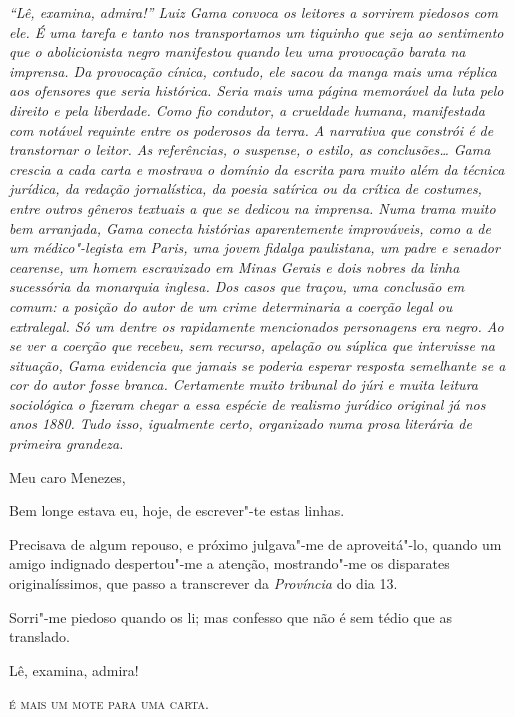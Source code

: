 \begin{flushleft}
{\footnotesize\itshape
``Lê, examina, admira!'' Luiz Gama convoca os leitores a sorrirem
piedosos com ele. É uma tarefa e tanto nos transportamos um tiquinho que
seja ao sentimento que o abolicionista negro manifestou quando leu uma
provocação barata na imprensa. Da provocação cínica, contudo, ele sacou
da manga mais uma réplica aos ofensores que seria histórica. Seria mais
uma página memorável da
luta pelo direito e pela liberdade. Como fio condutor, a crueldade
humana, manifestada com notável requinte entre os poderosos da terra. A
narrativa que constrói é de transtornar o leitor. As referências, o
suspense, o estilo, as conclusões\ldots{} Gama crescia a cada carta e
mostrava o domínio da escrita para muito além da técnica jurídica, da
redação jornalística, da poesia satírica ou da crítica de costumes,
entre outros gêneros textuais a que se dedicou na imprensa. Numa trama
muito bem arranjada, Gama conecta histórias aparentemente improváveis,
como a de um médico"-legista em Paris, uma jovem fidalga paulistana, um
padre e senador cearense, um homem escravizado em Minas Gerais e dois
nobres da linha sucessória da monarquia inglesa. Dos casos que traçou,
uma conclusão em comum: a posição do autor de um crime determinaria a coerção
legal ou extralegal. Só um dentre os rapidamente mencionados personagens
era negro. Ao se ver a coerção que recebeu, sem recurso, apelação ou
súplica que intervisse na situação, Gama evidencia que jamais se poderia esperar
resposta semelhante se a cor do autor fosse branca. Certamente muito
tribunal do júri e muita leitura sociológica o fizeram chegar a essa
espécie de realismo jurídico original já nos anos 1880. Tudo isso,
igualmente certo, organizado numa prosa literária de primeira grandeza.}
\end{flushleft}


\noindent{}Meu caro Menezes,\smallskip

Bem longe estava eu, hoje, de escrever"-te estas linhas.

Precisava de algum repouso, e próximo julgava"-me de aproveitá"-lo, quando
um amigo indignado despertou"-me a atenção, mostrando"-me os disparates
originalíssimos, que passo a transcrever da \emph{Província} do dia 13.

Sorri"-me piedoso quando os li; mas confesso que não é sem tédio que as
translado.

Lê, examina, admira!

\textsc{é mais um mote para uma carta.}

